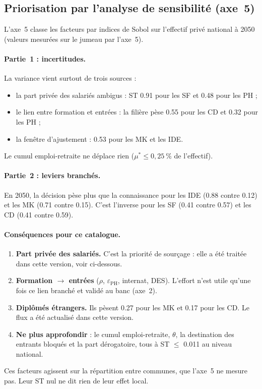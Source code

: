 \subsection{Priorisation par l'analyse de sensibilité (axe~5)}

L'axe~5 classe les facteurs par indices de Sobol sur l'effectif privé
national à 2050 (valeurs mesurées sur le jumeau par l'axe~5).

\paragraph{Partie~1 : incertitudes.}
La variance vient surtout de trois sources :
\begin{itemize}
\item la part privée des salariés ambigus : ST \num{0.91} pour les SF et
  \num{0.48} pour les PH ;
\item le lien entre formation et entrées : la filière pèse \num{0.55} pour
  les CD et \num{0.32} pour les PH ;
\item la fenêtre d'ajustement : \num{0.53} pour les MK et les IDE.
\end{itemize}
Le cumul emploi-retraite ne déplace rien ($\mu^* \le 0,25~\%$ de l'effectif).

\paragraph{Partie~2 : leviers branchés.}
En 2050, la décision pèse plus que la connaissance pour les IDE
(\num{0.88} contre \num{0.12}) et les MK (\num{0.71} contre \num{0.15}).
C'est l'inverse pour les SF (\num{0.41} contre \num{0.57}) et les CD
(\num{0.41} contre \num{0.59}).

\paragraph{Conséquences pour ce catalogue.}
\begin{enumerate}
\item \textbf{Part privée des salariés.} C'est la priorité de sourçage :
  elle a été traitée dans cette version, voir ci-dessous.
\item \textbf{Formation $\to$ entrées} ($\rho$, $\varepsilon_{\mathrm{PH}}$,
  internat, DES). L'effort n'est utile qu'une fois ce lien branché et
  validé au banc (axe~2).
\item \textbf{Diplômés étrangers.} Ils pèsent \num{0.27} pour les MK et
  \num{0.17} pour les CD. Le flux a été actualisé dans cette version.
\item \textbf{Ne plus approfondir} : le cumul emploi-retraite, $\theta$, la
  destination des entrants bloqués et la part dérogatoire, tous à ST
  $\le$ \num{0.011} au niveau national.
\end{enumerate}
Ces facteurs agissent sur la répartition entre communes, que l'axe~5 ne
mesure pas. Leur ST nul ne dit rien de leur effet local.

